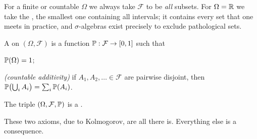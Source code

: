 For a finite or countable $\Omega$ we always take $\mathcal F$ to be \emph{all} subsets. For $\Omega=\mathbb{R}$ we take the , the smallest one containing all intervals; it contains every set that one meets in practice, and $\sigma$-algebras exist precisely to exclude pathological sets.

\begin{definition}\label{def:probmeasure}
  A  on $(\Omega,\mathcal F)$ is a function $\mathbb{P}:\mathcal F\to[0,1]$ such that
  \begin{steps}
    \item $\mathbb{P}(\Omega)=1$;
    \item \emph{(countable additivity)} if $A_1,A_2,\dots\in\mathcal F$ are pairwise disjoint, then $\mathbb{P}\bigl(\bigcup_iA_i\bigr)=\sum_i\mathbb{P}(A_i)$.
  \end{steps}
  The triple $(\Omega,\mathcal F,\mathbb{P})$ is a .
\end{definition}

These two axioms, due to Kolmogorov, are all there is. Everything else is a consequence.

